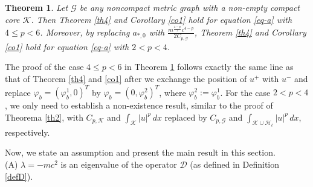 \documentclass[11pt]{amsart}
\newtheorem{theorem}{Theorem}[section]
\newcommand{\D}{\mathcal{D}}
\newcommand{\G}{\mathcal{G}}
\newcommand{\K}{\mathcal{K}}
\numberwithin{equation}{section}
\begin{document}
\begin{theorem}\label{th-a2}
      Let $\G$ be any noncompact metric graph with a non-empty compact core $\K$. Then Theorem \ref{th4} and Corollary \ref{co1} hold for equation \eqref{eq-a} with $4\leq p<6$. Moreover, by replacing $a_{*,0}$ with $
\frac{m^\frac{4-p}{2}c^{4-p}}{2C_{p,\G}}
$, Theorem \ref{th4} and Corollary \ref{co1} hold for equation \eqref{eq-a} with $2< p<4$.
\end{theorem}
The proof of the case $4\leq p<6$ in Theorem \ref{th-a2} follows exactly the same line as that of Theorem \ref{th4} and \ref{co1} after we exchange the position of $u^+$ with $u^-$ and replace $\varphi_{b} = (\varphi_{b}^1,0)^T$ by $\varphi_{b} = (0,\varphi_{b}^2)^T$, where $\varphi_{b}^2:=\varphi_{b}^1$. For the case $2< p<4$, we only need to establish a non-existence result, similar to the proof of Theorema \ref{th2}, with $C_{p,\K}$ and $\int_{\K}|u|^{p}\,dx$ replaced by $C_{p,\G}$ and $\int_{\K\cup\mathcal{H}_\ell}|u|^{p}\,dx$, respectively.

Now, we state an assumption and present the main result in this section.\\
{\rm (A)} $\lambda = -mc^2$ is an eigenvalue of the operator $\D$ (as defined in Definition \ref{defD}).
\end{document}

